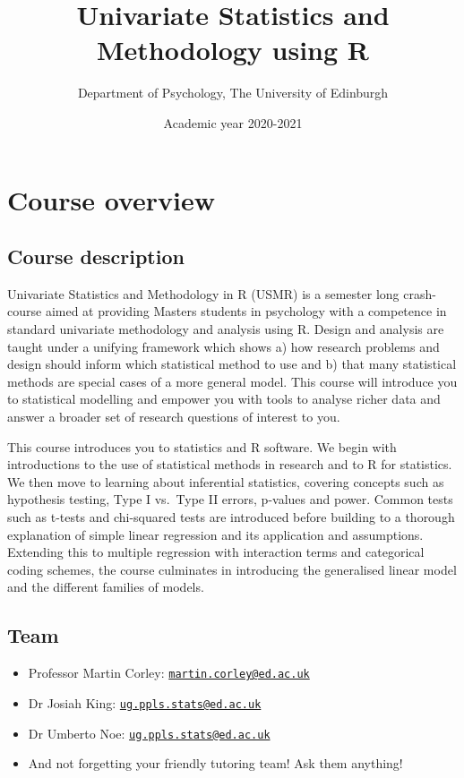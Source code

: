 \documentclass[]{book}
\title{Univariate Statistics and Methodology using R}
\author{Department of Psychology, The University of Edinburgh}
\date{Academic year 2020-2021}
\providecommand{\tightlist}{%
  \setlength{\itemsep}{0pt}\setlength{\parskip}{0pt}}
\begin{document}
\maketitle

{
\setcounter{tocdepth}{1}
\tableofcontents
}
\hypertarget{chap-overview}{%
\chapter*{Course overview}\label{chap-overview}}

\hypertarget{course-description}{%
\section*{Course description}\label{course-description}}

Univariate Statistics and Methodology in R (USMR) is a semester long crash-course aimed at providing Masters students in psychology with a competence in standard univariate methodology and analysis using R. Design and analysis are taught under a unifying framework which shows a) how research problems and design should inform which statistical method to use and b) that many statistical methods are special cases of a more general model. This course will introduce you to statistical modelling and empower you with tools to analyse richer data and answer a broader set of research questions of interest to you.

This course introduces you to statistics and R software. We begin with introductions to the use of statistical methods in research and to R for statistics. We then move to learning about inferential statistics, covering concepts such as hypothesis testing, Type I vs.~Type II errors, p-values and power. Common tests such as t-tests and chi-squared tests are introduced before building to a thorough explanation of simple linear regression and its application and assumptions. Extending this to multiple regression with interaction terms and categorical coding schemes, the course culminates in introducing the generalised linear model and the different families of models.

\hypertarget{team}{%
\section*{Team}\label{team}}

\begin{itemize}
\tightlist
\item
  Professor Martin Corley: \href{mailto:martin.corley@ed.ac.uk}{\nolinkurl{martin.corley@ed.ac.uk}}
\item
  Dr Josiah King: \href{mailto:ug.ppls.stats@ed.ac.uk}{\nolinkurl{ug.ppls.stats@ed.ac.uk}}
\item
  Dr Umberto Noe: \href{mailto:ug.ppls.stats@ed.ac.uk}{\nolinkurl{ug.ppls.stats@ed.ac.uk}}
\item
  And not forgetting your friendly tutoring team! Ask them anything!
\end{itemize}
\end{document}

